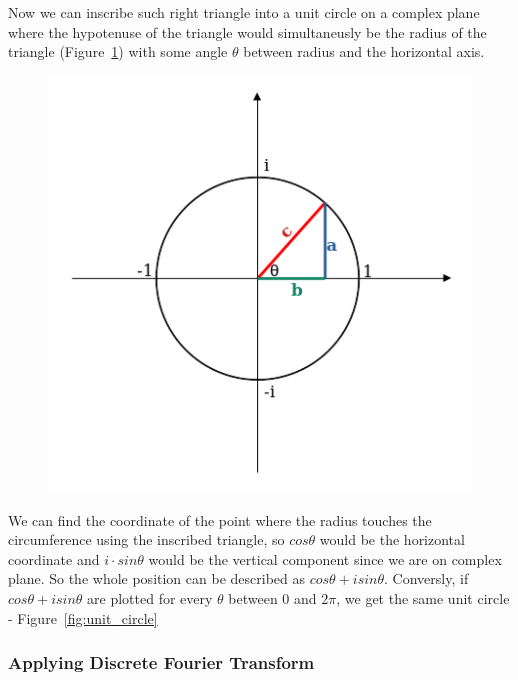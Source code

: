 \documentclass[titlepage]{article}
\begin{document}
    Now we can inscribe such right triangle into a unit circle on a complex plane
    where the hypotenuse of the triangle would simultaneusly be the radius of 
    the triangle (Figure~\ref{fig:inscribed_triangle}) with some angle $\theta$ between
    radius and the horizontal axis.
    \begin{figure}[H]
        \caption{}
        \centering
        \includegraphics[width=0.4\linewidth]{inscribed_triangle}
        \label{fig:inscribed_triangle}
    \end{figure}
    We can find the coordinate of the point where the radius touches the circumference
    using the inscribed triangle, so $cos\theta$ would be the horizontal coordinate
    and $i \cdot sin\theta$ would be the vertical component since we are on complex
    plane. So the whole position can be described as $cos\theta + isin\theta$.
    Conversly, if $cos\theta + isin\theta$ are plotted for every $\theta$ between
    $0$ and $2\pi$, we get the same unit circle - Figure~\ref{fig:unit_circle}


\subsubsection{Applying Discrete Fourier Transform}
    
\end{document}

